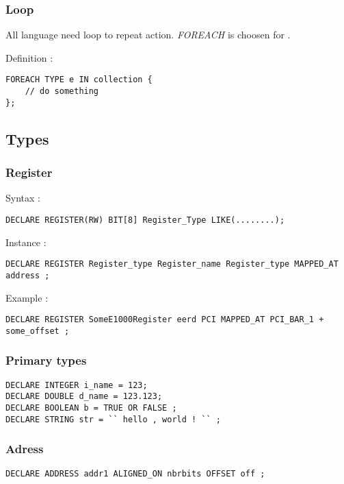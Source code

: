 \documentclass[american]{rtxreport}
\begin{document}
\subsubsection{Loop}

All language need loop to repeat action.
\emph{FOREACH} is choosen for \rtx.

Definition :

\begin{lstlisting}
FOREACH TYPE e IN collection {
	// do something
};
\end{lstlisting}


\subsection{Types}

\subsubsection{Register}

Syntax :
\begin{lstlisting}
DECLARE REGISTER(RW) BIT[8] Register_Type LIKE(........);
\end{lstlisting}

Instance :
\begin{lstlisting}
DECLARE REGISTER Register_type Register_name Register_type MAPPED_AT address ;
\end{lstlisting}

Example :
\begin{lstlisting}
DECLARE REGISTER SomeE1000Register eerd PCI MAPPED_AT PCI_BAR_1 + some_offset ;
\end{lstlisting}


\subsubsection{Primary types}

\begin{lstlisting}
DECLARE INTEGER i_name = 123;
DECLARE DOUBLE d_name = 123.123;
DECLARE BOOLEAN b = TRUE OR FALSE ;
DECLARE STRING str = `` hello , world ! `` ;

\end{lstlisting}

\subsubsection{Adress}
\begin{lstlisting}
DECLARE ADDRESS addr1 ALIGNED_ON nbrbits OFFSET off ;
\end{lstlisting}
\end{document}
